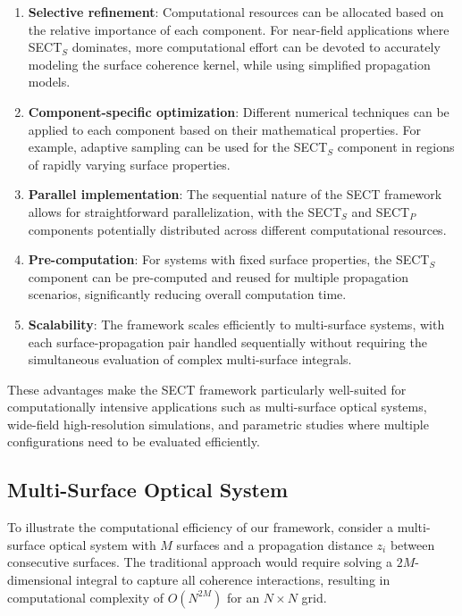 \documentclass[a4paper,12pt]{article}
\begin{document}
\begin{enumerate}
\item \textbf{Selective refinement}: Computational resources can be allocated based on the relative importance of each component. For near-field applications where SECT$_S$ dominates, more computational effort can be devoted to accurately modeling the surface coherence kernel, while using simplified propagation models.

\item \textbf{Component-specific optimization}: Different numerical techniques can be applied to each component based on their mathematical properties. For example, adaptive sampling can be used for the SECT$_S$ component in regions of rapidly varying surface properties.

\item \textbf{Parallel implementation}: The sequential nature of the SECT framework allows for straightforward parallelization, with the SECT$_S$ and SECT$_P$ components potentially distributed across different computational resources.

\item \textbf{Pre-computation}: For systems with fixed surface properties, the SECT$_S$ component can be pre-computed and reused for multiple propagation scenarios, significantly reducing overall computation time.

\item \textbf{Scalability}: The framework scales efficiently to multi-surface systems, with each surface-propagation pair handled sequentially without requiring the simultaneous evaluation of complex multi-surface integrals.
\end{enumerate}

These advantages make the SECT framework particularly well-suited for computationally intensive applications such as multi-surface optical systems, wide-field high-resolution simulations, and parametric studies where multiple configurations need to be evaluated efficiently.

\subsection{Multi-Surface Optical System}

To illustrate the computational efficiency of our framework, consider a multi-surface optical system with $M$ surfaces and a propagation distance $z_i$ between consecutive surfaces. The traditional approach would require solving a $2M$-dimensional integral to capture all coherence interactions, resulting in computational complexity of $O(N^{2M})$ for an $N \times N$ grid.
\end{document}
